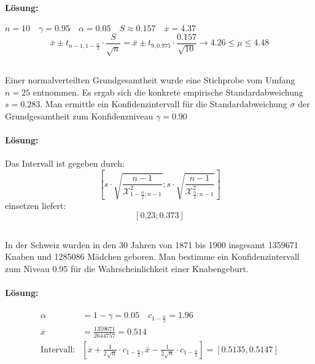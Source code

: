 \documentclass[ngerman]{scrartcl}
\begin{document}
\paragraph{Lösung:}
$n=10\quad\gamma=0.95\quad\alpha=0.05\quad S\approx 0.157\quad\overline{x}=4.37$\\
\begin{equation*}
\overline{x} \pm t_{n-1,1-\frac{\alpha}{2}}\cdot\frac{S}{\sqrt{n}} = \overline{x}\pm t_{9,0.975}\cdot\frac{0.157}{\sqrt{10}}\rightarrow 4.26\leq\mu\leq 4.48
\end{equation*}
\subsection{}
Einer normalverteilten Grundgesamtheit wurde eine Stichprobe vom Umfang $n=25$ entnommen. Es ergab sich die konkrete empirische Standardabweichung $s=0.283$. Man ermittle ein Konfidenzintervall für die Standardabweichung $\sigma$ der Grundgesamtheit zum Konfidenzniveau $\gamma = 0.90$
\paragraph{Lösung:}
Das Intervall ist gegeben durch:
\begin{equation*}
\left[s\cdot\sqrt{\frac{n-1}{\mathcal{X}^{2}_{1-\frac{\alpha}{2};n-1}}} ; s\cdot\sqrt{\frac{n-1}{\mathcal{X}^{2}_{\frac{\alpha}{2};n-1}}}\right]
\end{equation*}
einsetzen liefert:
\begin{equation*}
\left[0.23;0.373\right]
\end{equation*}

\subsection{}
In der Schweiz wurden in den 30 Jahren von 1871 bis 1900 insgesamt 1359671 Knaben und 1285086 Mädchen geboren. Man bestimme ein Konfidenzintervall zum Niveau 0.95 für die Wahrscheinlichkeit einer Knabengeburt.
\paragraph{Lösung:}
\begin{align*}
\alpha &= 1 - \gamma = 0.05\quad c_{1-\frac{\alpha}{2}} = 1.96\\
\overline{x} &= \frac{1359671}{2644757}=0.514\\
\text{Intervall:} & \left[\overline{x}+\frac{1}{2\sqrt{n}}\cdot c_{1-\frac{\alpha}{2}}, \overline{x}-\frac{1}{2\sqrt{n}}\cdot c_{1-\frac{\alpha}{2}}\right] = \left[ 0.5135, 0.5147\right]
\end{align*}
\end{document}
